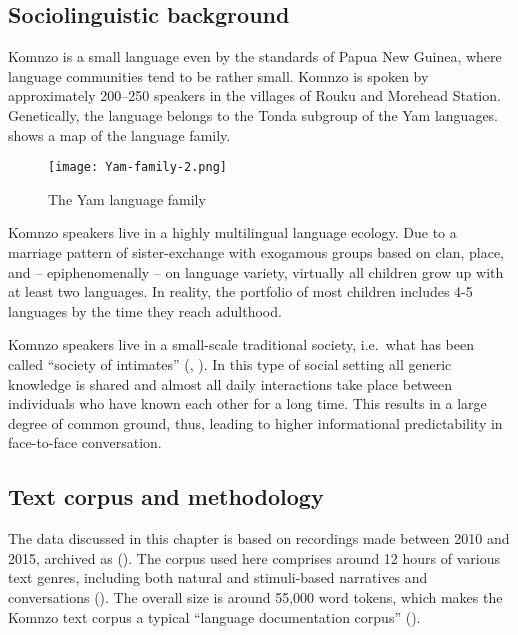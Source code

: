 \documentclass[output=paper,colorlinks,citecolor=brown]{langscibook}
\begin{document}
\subsection{Sociolinguistic background}\label{sec:doehler:socioling}

Komnzo is a small language even by the standards of Papua New Guinea, where language communities tend to be rather small. Komnzo is spoken by approximately 200–250 speakers in the villages of Rouku and Morehead Station. Genetically, the language belongs to the Tonda subgroup of the Yam languages.  shows a map of the language family.

\begin{figure}
    \texttt{[image: Yam-family-2.png]}
    \caption{The Yam language family}
    \label{fig:doehler:yamfamily}
\end{figure}

Komnzo speakers live in a highly multilingual language ecology. Due to a marriage pattern of sister-exchange with exogamous groups based on clan, place, and -- epiphenomenally -- on language variety, virtually all children grow up with at least two languages. In reality, the portfolio of most children includes 4-5 languages by the time they reach adulthood.

Komnzo speakers live in a small-scale traditional society, i.e.\ what has been called ``society of intimates'' (\cite{Givon:2018sl}, \cite{Givon:2002nn}). In this type of social setting all generic knowledge is shared and almost all daily interactions take place between individuals who have known each other for a long time. This results in a large degree of common ground, thus, leading to higher informational predictability in face-to-face conversation.

\subsection{Text corpus and methodology}\label{sec:doehler:corpus}

The data discussed in this chapter is based on recordings made between 2010 and 2015, archived as (\cite{Dohler:2020tx}). The corpus used here comprises around 12 hours of various text genres, including both natural and stimuli-based narratives and conversations (). The overall size is around 55,000 word tokens, which makes the Komnzo text corpus a typical ``language documentation corpus'' (\cite{Mosel:2012ul}).
\end{document}
